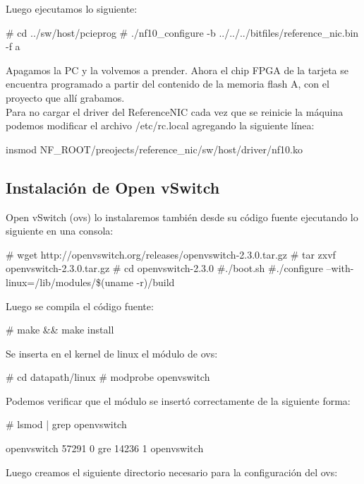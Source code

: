 Luego ejecutamos lo siguiente:

\begin{bash}
# cd ../sw/host/pcieprog
# ./nf10_configure -b ../../../bitfiles/reference_nic.bin -f a
\end{bash}

Apagamos la PC y la volvemos a prender. Ahora el chip FPGA de la tarjeta se encuentra programado a partir del contenido de la memoria flash A, con el proyecto que allí grabamos.\\

Para no cargar el driver del ReferenceNIC cada vez que se reinicie la máquina podemos modificar el archivo /etc/rc.local agregando la siguiente línea:

\begin{bash}
insmod NF_ROOT/preojects/reference_nic/sw/host/driver/nf10.ko
\end{bash}

\subsection{Instalación de Open vSwitch}
Open vSwitch (ovs) lo instalaremos también desde su código fuente ejecutando lo siguiente en una consola:

\begin{bash}
# wget http://openvswitch.org/releases/openvswitch-2.3.0.tar.gz
# tar zxvf openvswitch-2.3.0.tar.gz
# cd openvswitch-2.3.0
#./boot.sh
#./configure --with-linux=/lib/modules/\$(uname -r)/build
\end{bash}

Luego se compila el código fuente:

\begin{bash}
# make && make install
\end{bash}

Se inserta en el kernel de linux el módulo de ovs:

\begin{bash}
# cd datapath/linux
# modprobe openvswitch
\end{bash}

Podemos verificar que el módulo se insertó correctamente de la siguiente forma:

\begin{bash}
# lsmod | grep openvswitch

openvswitch    57291      0  
gre         14236         1     openvswitch
\end{bash}

Luego creamos el siguiente directorio necesario para la configuración del ovs:

